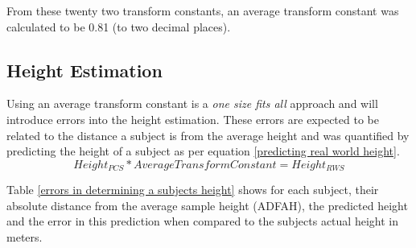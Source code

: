 From these twenty two transform constants, an average transform constant was calculated to be 0.81 (to two decimal places). 

\subsection{Height Estimation}
\label{height estimation}
Using an average transform constant is a \emph{one size fits all} approach and will introduce errors into the height estimation. These errors are expected to be related to the distance a subject is from the average height and was quantified by predicting the height of a subject as per equation \ref{predicting real world height}.\\

\begin{equation}
Height_{PCS} * Average Transform Constant = Height_{RWS}
\label{predicting real world height}
\end{equation}

Table \ref{errors in determining a subjects height} shows for each subject, their absolute distance from the average sample height (ADFAH), the predicted height and the error in this prediction when compared to the subjects actual height in meters.\\ 

